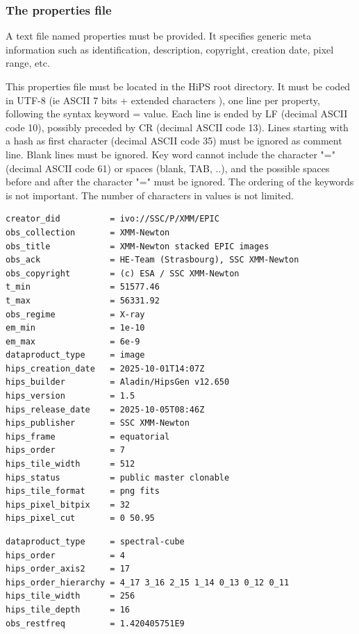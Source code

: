 \documentclass[11pt,a4paper]{ivoa}
\begin{document}
\subsubsection{The properties file}

A text file named properties must be provided. It specifies generic meta information such as identification, description, copyright, creation date, pixel range, etc.

This properties file must be located in the HiPS root directory. It must be coded in UTF-8 (ie ASCII 7 bits + extended characters \citep{RFC3629}), one line per property, following the syntax keyword = value. Each line is ended by LF (decimal ASCII code 10), possibly preceded by CR (decimal ASCII code 13). Lines starting with a hash as first character (decimal ASCII code 35) must be ignored as comment line. Blank lines must be ignored. Key word cannot include the character "=" (decimal ASCII code 61) or spaces (blank, TAB, ..), and the possible spaces before and after the character "=" must be ignored. The ordering of the keywords is not important. The number of characters in values is not limited.

\begin{tcolorbox}[title=Example of a properties file for HiPS image]
\begin{verbatim}
creator_did          = ivo://SSC/P/XMM/EPIC
obs_collection       = XMM-Newton
obs_title            = XMM-Newton stacked EPIC images
obs_ack              = HE-Team (Strasbourg), SSC XMM-Newton
obs_copyright        = (c) ESA / SSC XMM-Newton
t_min                = 51577.46
t_max                = 56331.92
obs_regime           = X-ray
em_min               = 1e-10
em_max               = 6e-9
dataproduct_type     = image
hips_creation_date   = 2025-10-01T14:07Z
hips_builder         = Aladin/HipsGen v12.650
hips_version         = 1.5
hips_release_date    = 2025-10-05T08:46Z
hips_publisher       = SSC XMM-Newton
hips_frame           = equatorial
hips_order           = 7
hips_tile_width      = 512
hips_status          = public master clonable
hips_tile_format     = png fits
hips_pixel_bitpix    = 32
hips_pixel_cut       = 0 50.95
\end{verbatim}
\end{tcolorbox}

\medskip

\begin{tcolorbox}[title=Example of properties key words dedicated\\to frequency-spacial HiPS cube]
\begin{verbatim}
dataproduct_type     = spectral-cube
hips_order           = 4
hips_order_axis2     = 17
hips_order_hierarchy = 4_17 3_16 2_15 1_14 0_13 0_12 0_11
hips_tile_width      = 256
hips_tile_depth      = 16
obs_restfreq         = 1.420405751E9
\end{verbatim}
\end{tcolorbox}
\end{document}
